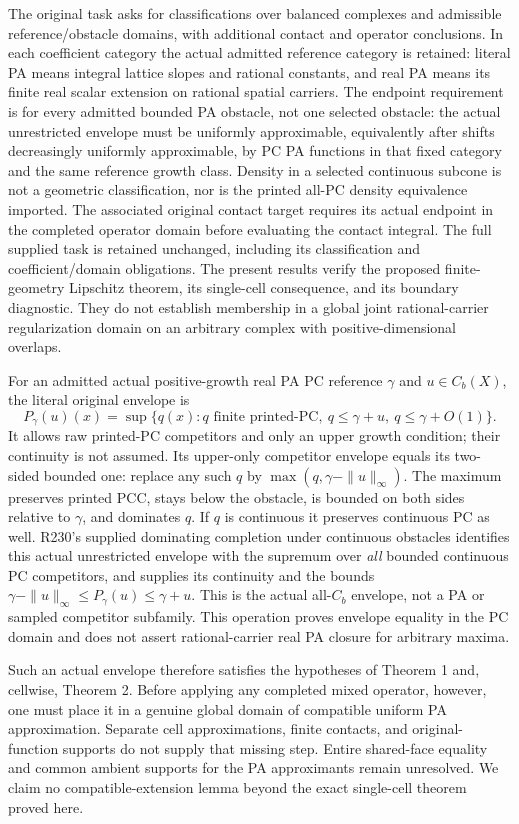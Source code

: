 \documentclass[
  11pt,
]{article}
\begin{document}
The original task asks for classifications over balanced complexes and
admissible reference/obstacle domains, with additional contact and
operator conclusions. In each coefficient category the actual admitted
reference category is retained: literal PA means integral lattice slopes
and rational constants, and real PA means its finite real scalar
extension on rational spatial carriers. The endpoint requirement is for
every admitted bounded PA obstacle, not one selected obstacle: the
actual unrestricted envelope must be uniformly approximable,
equivalently after shifts decreasingly uniformly approximable, by PC PA
functions in that fixed category and the same reference growth class.
Density in a selected continuous subcone is not a geometric
classification, nor is the printed all-PC density equivalence imported.
The associated original contact target requires its actual endpoint in
the completed operator domain before evaluating the contact integral.
The full supplied task is retained unchanged, including its
classification and coefficient/domain obligations. The present results
verify the proposed finite-geometry Lipschitz theorem, its single-cell
consequence, and its boundary diagnostic. They do not establish
membership in a global joint rational-carrier regularization domain on
an arbitrary complex with positive-dimensional overlaps.

For an admitted actual positive-growth real PA PC reference \(\gamma\)
and \(u\in C_b(X)\), the literal original envelope is \[
P_\gamma(u)(x)=\sup\{q(x):q\text{ finite printed-PC},\ q\leq\gamma+u,\ q\leq\gamma+O(1)\}.
\] It allows raw printed-PC competitors and only an upper growth
condition; their continuity is not assumed. Its upper-only competitor
envelope equals its two-sided bounded one: replace any such \(q\) by
\(\max(q,\gamma-\|u\|_\infty)\). The maximum preserves printed PCC,
stays below the obstacle, is bounded on both sides relative to
\(\gamma\), and dominates \(q\). If \(q\) is continuous it preserves
continuous PC as well. R230's supplied dominating completion under
continuous obstacles identifies this actual unrestricted envelope with
the supremum over \emph{all} bounded continuous PC competitors, and
supplies its continuity and the bounds
\(\gamma-\|u\|_\infty\leq P_\gamma(u)\leq\gamma+u\). This is the actual
all-\(C_b\) envelope, not a PA or sampled competitor subfamily. This
operation proves envelope equality in the PC domain and does not assert
rational-carrier real PA closure for arbitrary maxima.

Such an actual envelope therefore satisfies the hypotheses of Theorem 1
and, cellwise, Theorem 2. Before applying any completed mixed operator,
however, one must place it in a genuine global domain of compatible
uniform PA approximation. Separate cell approximations, finite contacts,
and original-function supports do not supply that missing step. Entire
shared-face equality and common ambient supports for the PA approximants
remain unresolved. We claim no compatible-extension lemma beyond the
exact single-cell theorem proved here.
\end{document}
